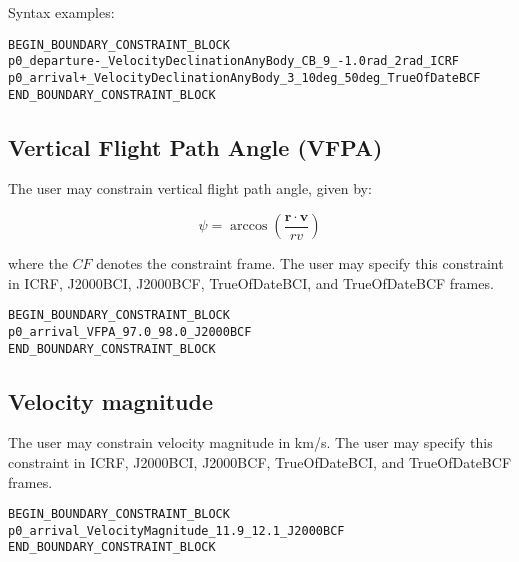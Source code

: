 \documentclass[11pt]{article}
\begin{document}
Syntax examples:

\begin{verbatim}
BEGIN_BOUNDARY_CONSTRAINT_BLOCK
p0_departure-_VelocityDeclinationAnyBody_CB_9_-1.0rad_2rad_ICRF
p0_arrival+_VelocityDeclinationAnyBody_3_10deg_50deg_TrueOfDateBCF
END_BOUNDARY_CONSTRAINT_BLOCK
\end{verbatim}

\subsection{Vertical Flight Path Angle (VFPA)}
\label{subsec:velocity_vertical_flight_path_angle}
The user may constrain vertical flight path angle, given by:

\begin{equation}
\psi = \arccos \left(\frac{\mathbf{r} \cdot \mathbf{v} }{rv}\right)
\end{equation}

\noindent where the $CF$ denotes the constraint frame. The user may specify this constraint in ICRF, J2000BCI, J2000BCF, TrueOfDateBCI, and TrueOfDateBCF frames.

\begin{verbatim}
BEGIN_BOUNDARY_CONSTRAINT_BLOCK
p0_arrival_VFPA_97.0_98.0_J2000BCF
END_BOUNDARY_CONSTRAINT_BLOCK
\end{verbatim}

\subsection{Velocity magnitude}
\label{subsec:velocity_magnitude}
The user may constrain velocity magnitude in km/s. The user may specify this constraint in ICRF, J2000BCI, J2000BCF, TrueOfDateBCI, and TrueOfDateBCF frames.

\begin{verbatim}
BEGIN_BOUNDARY_CONSTRAINT_BLOCK
p0_arrival_VelocityMagnitude_11.9_12.1_J2000BCF
END_BOUNDARY_CONSTRAINT_BLOCK
\end{verbatim}
\end{document}
